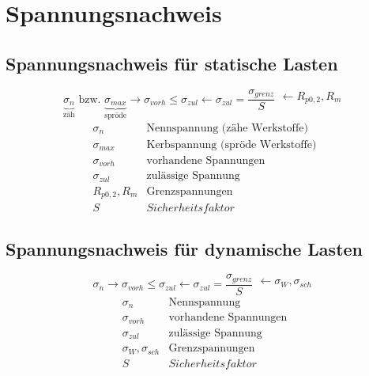 



\section{Spannungsnachweis}

\subsection{Spannungsnachweis für statische Lasten}
\[ \underbrace{\sigma_n}_\text{zäh} \text{ bzw. } \underbrace{\sigma_{max}}_\text{spröde} \rightarrow \sigma_{vorh} \leq \sigma_{zul} \leftarrow \sigma_{zul} = \frac{\sigma_{grenz}}{S} \begin{matrix} \leftarrow R_{p0,2}, R_m\\~ \end{matrix} \]
\[ \begin{array}{ll}
\sigma_n & \text{Nennspannung (zähe Werkstoffe)}\\
\sigma_{max} & \text{Kerbspannung (spröde Werkstoffe)}\\
\sigma_{vorh} & \text{vorhandene Spannungen}\\
\sigma_{zul} & \text{zulässige Spannung}\\
R_{p0,2}, R_m & \text{Grenzspannungen}\\
S & Sicherheitsfaktor
\end{array} \]

\subsection{Spannungsnachweis für dynamische Lasten}
\[ \sigma_n  \rightarrow \sigma_{vorh} \leq \sigma_{zul} \leftarrow \sigma_{zul} = \frac{\sigma_{grenz}}{S} \begin{matrix} \leftarrow \sigma_W, \sigma_{sch}\\~ \end{matrix} \]
\[ \begin{array}{ll}
\sigma_n & \text{Nennspannung}\\
\sigma_{vorh} & \text{vorhandene Spannungen}\\
\sigma_{zul} & \text{zulässige Spannung}\\
\sigma_W, \sigma_{sch} & \text{Grenzspannungen}\\
S & Sicherheitsfaktor
\end{array} \]
